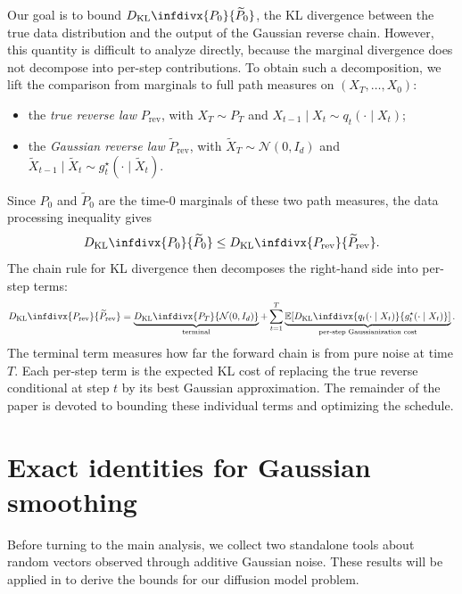 \documentclass[11pt]{article}
\def\E{\mathbb{E}}
\newcommand{\kl}{D_{\mathrm{KL}}\infdivx}
\begin{document}
Our goal is to bound \(\kl{P_0}{\widetilde P_0}\), the KL divergence between the true data distribution and the output of the Gaussian reverse chain. However, this quantity is difficult to analyze directly, because the marginal divergence does not decompose into per-step contributions. To obtain such a decomposition, we lift the comparison from marginals to full path measures on \((X_T,\dots,X_0)\):
\begin{itemize}[leftmargin=2.2em]
    \item the \emph{true reverse law} \(P_{\mathrm{rev}}\), with \(X_T\sim P_T\) and \(X_{t-1}\mid X_t\sim q_t(\cdot\mid X_t)\);
    \item the \emph{Gaussian reverse law} \(\widetilde P_{\mathrm{rev}}\), with \(\widetilde X_T\sim\mathcal N(0,I_d)\) and \(\widetilde X_{t-1}\mid \widetilde X_t\sim g_t^\star(\cdot\mid \widetilde X_t)\).
\end{itemize}
Since \(P_0\) and \(\widetilde P_0\) are the time-\(0\) marginals of these two path measures, the data processing inequality \cite[Theorem~2.8.1]{cover2006elements} gives
\begin{equation}
\label{eq:data_processing}
\kl{P_0}{\widetilde P_0}
\leq
\kl{P_{\mathrm{rev}}}{\widetilde P_{\mathrm{rev}}}.
\end{equation}
The chain rule for KL divergence \cite[Theorem~2.5.3]{cover2006elements} then decomposes the right-hand side into per-step terms:
\begin{equation}
\label{eq:path_kl_decomposition}
\kl{P_{\mathrm{rev}}}{\widetilde P_{\mathrm{rev}}}
=
\underbrace{\kl{P_T}{\mathcal N(0,I_d)}}_{\text{terminal}}
+
\sum_{t=1}^T
\underbrace{\E\!\left[
\kl{q_t(\cdot\mid X_t)}{g_t^\star(\cdot\mid X_t)}
\right]}_{\text{per-step Gaussianization cost}}.
\end{equation}
The terminal term measures how far the forward chain is from pure noise at time \(T\). Each per-step term is the expected KL cost of replacing the true reverse conditional at step \(t\) by its best Gaussian approximation. The remainder of the paper is devoted to bounding these individual terms and optimizing the schedule.

\section{Exact identities for Gaussian smoothing}
\label{sec:gaussian_smoothing}

Before turning to the main analysis, we collect two standalone tools about random vectors observed through additive Gaussian noise. These results will be applied in  to derive the bounds for our diffusion model problem. 
\end{document}

